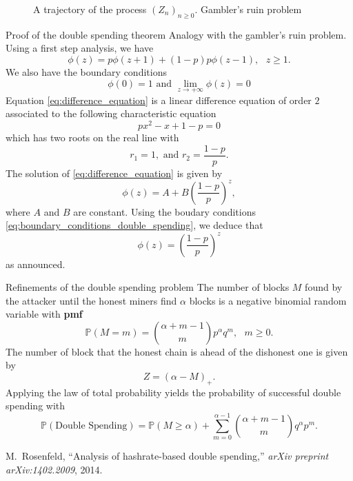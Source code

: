 \documentclass{beamer}
\makeatletter
\newcommand*{\pmf}{\textbf{pmf}\@\xspace}
\makeatother
\begin{document}
{\begin{frame}[plain]
\begin{figure}
\begin{tikzpicture}
\end{tikzpicture}
\caption{A trajectory of the process $(Z_n)_{n\geq0}$. Gambler's ruin problem}
\label{Fig:RuinTimeInsuranceRiskModel}
\end{figure}
\end{frame}
\begin{frame}[allowframebreaks]{Proof of the double spending theorem }
\scriptsize Analogy with the gambler's ruin problem. Using a first step analysis, we have 
\begin{equation}\label{eq:difference_equation}
\phi(z) = p\phi(z+1)+(1-p)p\phi(z-1),\text{ }z\geq1.
\end{equation}
We also have the boundary conditions
\begin{equation}\label{eq:boundary_conditions_double_spending}
\phi(0) = 1\text{ and }\underset{z\rightarrow +\infty}{\lim}\phi(z) = 0
\end{equation}
Equation \eqref{eq:difference_equation} is a linear difference equation of order $2$ associated to the following characteristic equation
$$
px^2 - x + 1-p = 0
$$
which has two roots on the real line with 
$$
r_1 = 1, \text{ and }r_2 = \frac{1-p}{p}.
$$
The solution of \eqref{eq:difference_equation} is given by 
$$
\phi(z)=A+B\left(\frac{1-p}{p}\right)^z,
$$
where $A$ and $B$ are constant. Using the boudary conditions \eqref{eq:boundary_conditions_double_spending}, we deduce that
$$
\phi(z) = \left(\frac{1-p}{p}\right)^z
$$
as announced.
\end{frame}
\begin{frame}{Refinements of the double spending problem}
\small
The number of blocks $M$ found by the attacker until the honest miners find $\alpha$ blocks is a negative binomial random variable with \pmf
$$
\mathbb{P}(M = m) = \binom{\alpha+m-1}{m}p^\alpha q^m,\text{ }m\geq0.
$$
The number of block that the honest chain is ahead of the dishonest one is given by 
$$
Z= (\alpha-M)_+.
$$
Applying the law of total probability yields the probability of successful double spending with
$$
\mathbb{P}(\text{Double Spending}) = \mathbb{P}(M\geq \alpha) + \sum_{m = 0}^{\alpha - 1}\binom{\alpha+m-1}{m}q^\alpha p^m.
$$ 
\tiny
\begin{thebibliography}{1}
M.~Rosenfeld, ``Analysis of hashrate-based double spending,'' {\em arXiv
  preprint arXiv:1402.2009}, 2014.
\end{thebibliography}


\end{frame}}
\end{document}
